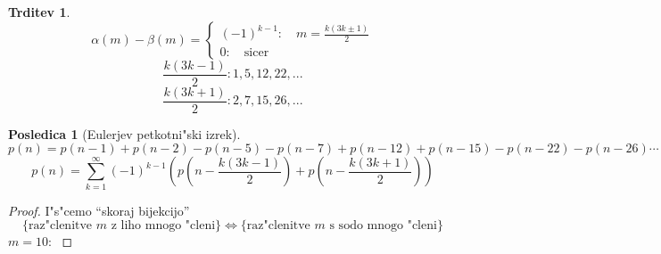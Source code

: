 \documentclass[a4paper,12pt]{article}
\theoremstyle{definition}
\newtheorem{conseq}[counter]{Posledica}
\newtheorem{claim}[counter]{Trditev}
\theoremstyle{remark}
\begin{document}
\begin{claim}
\[\alpha(m) - \beta(m) = \begin{cases}(-1)^{k - 1}: \quad m = \frac{k (3k \pm 1)}{2}  \\ 0: \quad \text{sicer} \end{cases}\]
\[\frac{k (3k - 1)}{2}: 1, 5, 12, 22, ...\]
\[\frac{k (3k + 1)}{2}: 2, 7, 15, 26, ...\]
\end{claim}

\begin{conseq}[Eulerjev petkotni"ski izrek]
	\[p(n) = p(n - 1) + p(n - 2) - p(n - 5) - p(n - 7) + p(n - 12) + p(n - 15) - p(n - 22) - p(n - 26) \cdots\]
	\[p(n) = \sum_{k = 1}^{\infty} (-1)^{k - 1} (p(n - \frac{k (3k - 1)}{2}) + p(n - \frac{k (3k + 1)}{2}))\]
\end{conseq}
\begin{proof}
	I"s"cemo ``skoraj bijekcijo'' \label{TODO: kaj to pomeni?}
	\[\{\text{raz"clenitve $m$ z liho mnogo "cleni}\} \iff \{\text{raz"clenitve $m$ s sodo mnogo "cleni}\}\]
	$m = 10$:
	\label{TODO: kaj se da nardit glede teh diagramov?}


\end{proof}
\end{document}
